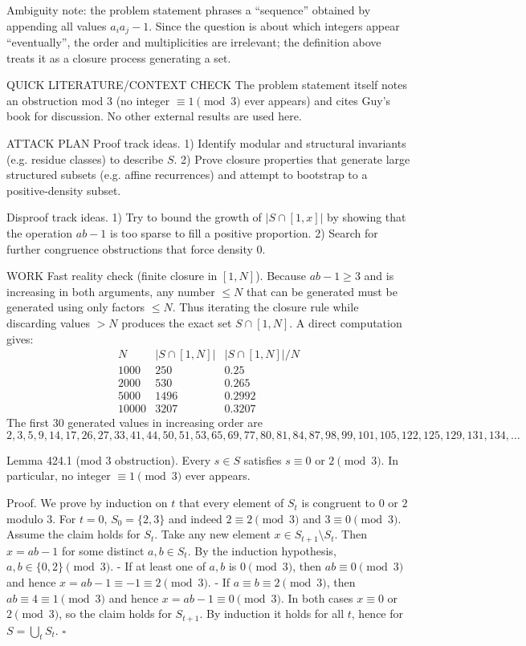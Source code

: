 Ambiguity note: the problem statement phrases a “sequence” obtained by appending all values $a_ia_j-1$. Since the question is about which integers appear “eventually”, the order and multiplicities are irrelevant; the definition above treats it as a closure process generating a set.

QUICK LITERATURE/CONTEXT CHECK
The problem statement itself notes an obstruction mod $3$ (no integer $\equiv 1\pmod 3$ ever appears) and cites Guy’s book for discussion. No other external results are used here.

ATTACK PLAN
Proof track ideas.
1) Identify modular and structural invariants (e.g. residue classes) to describe $S$.
2) Prove closure properties that generate large structured subsets (e.g. affine recurrences) and attempt to bootstrap to a positive-density subset.

Disproof track ideas.
1) Try to bound the growth of $|S\cap[1,x]|$ by showing that the operation $ab-1$ is too sparse to fill a positive proportion.
2) Search for further congruence obstructions that force density $0$.

WORK
Fast reality check (finite closure in $[1,N]$).
Because $ab-1\ge 3$ and is increasing in both arguments, any number $\le N$ that can be generated must be generated using only factors $\le N$.
Thus iterating the closure rule while discarding values $>N$ produces the exact set $S\cap[1,N]$.
A direct computation gives:
\[
\begin{array}{c|c|c}
 N & |S\cap[1,N]| & |S\cap[1,N]|/N\\\hline
 1000&250&0.25\\
 2000&530&0.265\\
 5000&1496&0.2992\\
 10000&3207&0.3207
\end{array}
\]
The first $30$ generated values in increasing order are
\[
2,3,5,9,14,17,26,27,33,41,44,50,51,53,65,69,77,80,81,84,87,98,99,101,105,122,125,129,131,134,\dots
\]

Lemma 424.1 (mod $3$ obstruction).
Every $s\in S$ satisfies $s\equiv 0$ or $2\pmod 3$. In particular, no integer $\equiv 1\pmod 3$ ever appears.

Proof.
We prove by induction on $t$ that every element of $S_t$ is congruent to $0$ or $2$ modulo $3$.
For $t=0$, $S_0=\{2,3\}$ and indeed $2\equiv 2\pmod 3$ and $3\equiv 0\pmod 3$.
Assume the claim holds for $S_t$.
Take any new element $x\in S_{t+1}\setminus S_t$. Then $x=ab-1$ for some distinct $a,b\in S_t$.
By the induction hypothesis, $a,b\in\{0,2\}\pmod 3$.
- If at least one of $a,b$ is $0\pmod 3$, then $ab\equiv 0\pmod 3$ and hence $x=ab-1\equiv -1\equiv 2\pmod 3$.
- If $a\equiv b\equiv 2\pmod 3$, then $ab\equiv 4\equiv 1\pmod 3$ and hence $x=ab-1\equiv 0\pmod 3$.
In both cases $x\equiv 0$ or $2\pmod 3$, so the claim holds for $S_{t+1}$.
By induction it holds for all $t$, hence for $S=\bigcup_t S_t$.
\hfill $\square$

